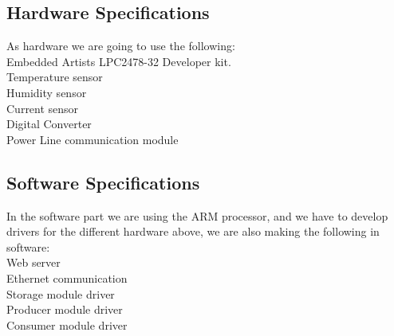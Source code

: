 \subsection{Hardware Specifications}
As hardware we are going to use the following: 
\\Embedded Artists LPC2478-32 Developer kit.
\\Temperature sensor
\\Humidity sensor
\\Current sensor
\\Digital Converter
\\Power Line communication module

\subsection{Software Specifications}
In the software part we are using the ARM processor, and we have to develop drivers for the different hardware above, we are also making the following in software:
\\Web server
\\Ethernet communication
\\Storage module driver
\\Producer module driver
\\Consumer module driver
